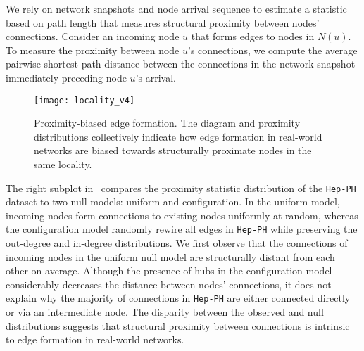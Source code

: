 


We rely on network snapshots and
node arrival sequence to estimate a statistic based on path length that measures
structural proximity between nodes' connections. Consider an incoming node $u$ that forms edges to nodes in $N(u)$.
To measure the proximity between node $u$'s connections, we compute the average
pairwise shortest path distance between the connections in the network snapshot
immediately preceding node $u$'s arrival.

\begin{figure}
 \centering
 \texttt{[image: locality\_v4]}
 \caption{
    Proximity-biased edge formation. The diagram and proximity distributions
    collectively indicate how edge formation in real-world networks are biased
    towards structurally proximate nodes in the same locality.  }
 \label{fig:locality}
 \vspace{-10pt}
\end{figure}


The right subplot in~ compares the proximity statistic
distribution of the \texttt{Hep-PH} dataset to two null models: uniform and
configuration. In the uniform model, incoming nodes form connections to existing
nodes uniformly at random, whereas the configuration model  randomly
rewire all edges in \texttt{Hep-PH} while preserving the out-degree and in-degree
distributions. We first observe that the connections of incoming nodes in the uniform
null model are structurally distant from each other on average.
Although the presence of hubs in the configuration model
considerably decreases the distance between nodes' connections, it does
not explain why the majority of connections in \texttt{Hep-PH} are either
connected directly or via an intermediate node. The disparity between the
observed and null distributions suggests that structural proximity between
connections is intrinsic to edge formation in real-world networks.




